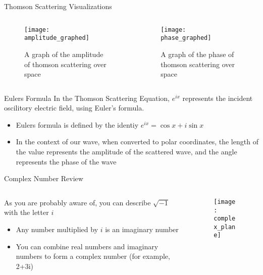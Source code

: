 \documentclass[aspectratio=169]{beamer}
\begin{document}
\begin{frame}{Thomson Scattering Visualizations}
	\begin{columns}
		\begin{column}{0.5\textwidth}
			\begin{figure}
				\texttt{[image: amplitude\_graphed]}
				\caption{A graph of the amplitude of thomson scattering over space}
			\end{figure}
		\end{column}
		
		\begin{column}{.5\textwidth}
			\begin{figure}
				\texttt{[image: phase\_graphed]}
				\caption{A graph of the phase of thomson scattering over space}
			\end{figure}			
		\end{column}
	\end{columns}
\end{frame}
	
\begin{frame}[t]{Eulers Formula}
	In the Thomson Scattering Equation, $e^{ix}$ represents the incident oscilitory electric field, using Euler's formula.
				
	\begin{itemize}
		\item Eulers formula is defined by the identiy $ e^{ix} = \cos x + i \sin x $
		\item In the context of our wave, when converted to polar coordinates, the length of the value represents the amplitude of the scattered wave, and the angle represents the phase of the wave
	\end{itemize}
\end{frame}

\begin{frame}[t]{Complex Number Review}
			
	\begin{columns}[c]
							
		\begin{column}{.5\textwidth}
			As you are probably aware of, you can describe $\sqrt{-1}$ with the letter $i$
			\begin{itemize}
				\item Any number multiplied by $i$ is an imaginary number
				\item You can combine real numbers and imaginary numbers to form a complex number (for example, 2+3i)
			\end{itemize}
		\end{column}
							
		\begin{column}{.5\textwidth}
			\begin{figure}
				\texttt{[image: complex\_plane]}
			\end{figure}
		\end{column}
							
	\end{columns}
				
\end{frame}
\end{document}
